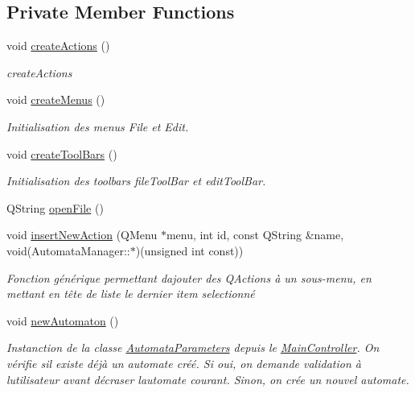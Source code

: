 \subsection*{Private Member Functions}
\begin{DoxyCompactItemize}
\item 
void \mbox{\hyperlink{class_main_controller_a26b5150d08fd0fecf209c3c8cd5c60b0}{create\+Actions}} ()
\begin{DoxyCompactList}\small\item\em create\+Actions \end{DoxyCompactList}\item 
void \mbox{\hyperlink{class_main_controller_a4d0f5b5351dcda6ce6e46fc606f916fb}{create\+Menus}} ()
\begin{DoxyCompactList}\small\item\em Initialisation des menus File et Edit. \end{DoxyCompactList}\item 
void \mbox{\hyperlink{class_main_controller_a141a116374c3605e54325bba6eaddb94}{create\+Tool\+Bars}} ()
\begin{DoxyCompactList}\small\item\em Initialisation des toolbars file\+Tool\+Bar et edit\+Tool\+Bar. \end{DoxyCompactList}\item 
Q\+String \mbox{\hyperlink{class_main_controller_a8cdfea32087af71164493b68c493a0e5}{open\+File}} ()
\item 
void \mbox{\hyperlink{class_main_controller_a48891e5a376e8315956222690238938f}{insert\+New\+Action}} (Q\+Menu $\ast$menu, int id, const Q\+String \&name, void(Automata\+Manager\+::$\ast$)(unsigned int const))
\begin{DoxyCompactList}\small\item\em Fonction générique permettant d\textquotesingle{}ajouter des Q\+Actions à un sous-\/menu, en mettant en tête de liste le dernier item selectionné \end{DoxyCompactList}\item 
void \mbox{\hyperlink{class_main_controller_ad0d31c3c005bf1ba9fda39455965ca0a}{new\+Automaton}} ()
\begin{DoxyCompactList}\small\item\em Instanction de la classe \mbox{\hyperlink{class_automata_parameters}{Automata\+Parameters}} depuis le \mbox{\hyperlink{class_main_controller}{Main\+Controller}}. On vérifie s\textquotesingle{}il existe déjà un automate créé. Si oui, on demande validation à l\textquotesingle{}utilisateur avant d\textquotesingle{}écraser l\textquotesingle{}automate courant. Sinon, on crée un nouvel automate. \end{DoxyCompactList}\item 

\end{DoxyCompactItemize}
